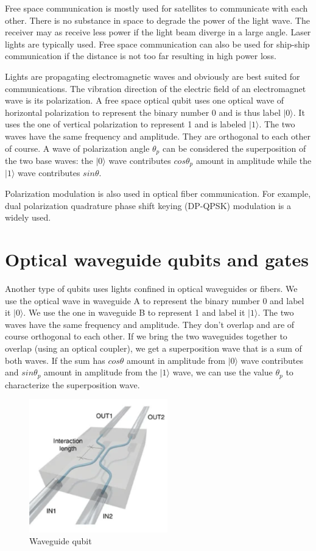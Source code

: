 \documentclass{book}
\newcommand\keta[2][]{#1\lvert {#2} #1\rangle}
\begin{document}
Free space communication is mostly used for satellites to communicate with each other. There is no substance in space to degrade the power of the light wave. The receiver may as receive less power if the light beam diverge in a large angle. Laser lights are typically used. Free space communication can also be used for ship-ship communication if the distance is not too far resulting in high power loss.

Lights are propagating electromagnetic waves and obviously are best suited for communications. The vibration direction of the electric field of an electromagnet wave is its polarization. A free space optical qubit uses one optical wave of horizontal polarization to represent the binary number 0 and is thus label $\keta{0}$. It uses the one of vertical polarization to represent 1 and is labeled $\keta{1}$. The two waves have the same frequency and amplitude. They are orthogonal to each other of course. A wave of polarization angle $\theta_p$ can be considered the superposition of the two base waves: the $\keta{0}$ wave contributes $cos\theta_p$ amount in amplitude while the $\keta{1}$ wave contributes $sin\theta$.

Polarization modulation is also used in optical fiber communication. For example, dual polarization quadrature phase shift keying (DP-QPSK) modulation is a widely used.

\section{Optical waveguide qubits and gates}
Another type of qubits uses lights confined in optical waveguides or fibers. We use the optical wave in waveguide A to represent the binary number 0 and label it $\keta{0}$. We use the one in waveguide B to represent 1 and label it $\keta{1}$. The two waves have the same frequency and amplitude. They don't overlap and are of course orthogonal to each other. If we bring the two waveguides together to overlap (using an optical coupler), we get a superposition wave that is a sum of both waves. If the sum has $cos\theta$ amount in amplitude from $\keta{0}$ wave contributes and $sin\theta_p$ amount in amplitude from the $\keta{1}$ wave, we can use the value $\theta_p$ to characterize the superposition wave.

\begin{figure}[ht]
\includegraphics[width=6cm]{pic/wguideQubit.png}
\caption{Waveguide qubit}
\label{Waveguide}
\end{figure}
\end{document}
